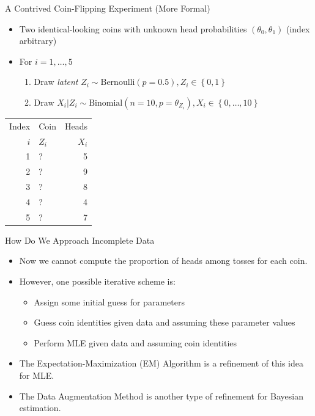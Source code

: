 \documentclass[dvipdfmx,bigger,aspectratio=169]{beamer}
\begin{document}
\begin{frame}[label={sec:orgcd74999}]{A Contrived Coin-Flipping Experiment (More Formal)}
\begin{itemize}
\item Two identical-looking coins with unknown head probabilities \((\theta_{0},\theta_{1})\) (index arbitrary)
\item For \(i = 1, \dots, 5\)
\begin{enumerate}
\item Draw \emph{latent} \(Z_{i} \sim \text{Bernoulli}(p = 0.5), Z_{i} \in \left\{ 0,1 \right\}\)
\item Draw \(X_{i} | Z_{i} \sim \text{Binomial}(n = 10, p = \theta_{Z_{i}}), X_{i} \in \left\{ 0, \dots, 10 \right\}\)
\end{enumerate}
\end{itemize}
\begin{center}
\begin{tabular}{rlr}
Index & Coin & Heads\\
\(i\) & \(Z_{i}\) & \(X_{i}\)\\
\hline
1 & ? & 5\\
2 & ? & 9\\
3 & ? & 8\\
4 & ? & 4\\
5 & ? & 7\\
\end{tabular}
\end{center}
\end{frame}

\begin{frame}[label={sec:org0a7bc05}]{How Do We Approach Incomplete Data}
\begin{itemize}
\item Now we cannot compute the proportion of heads among tosses for each coin.
\item However, one possible iterative scheme is:
\begin{itemize}
\item Assign some initial guess for parameters
\item Guess coin identities given data and assuming these parameter values
\item Perform MLE given data and assuming coin identities
\end{itemize}
\item The Expectation-Maximization (EM) Algorithm \cite{dempsterMaximumLikelihoodIncomplete1977} is a refinement of this idea for MLE.
\item The Data Augmentation Method \cite{tannerCalculationPosteriorDistributions1987} is another type of refinement for Bayesian estimation.
\end{itemize}
\end{frame}
\end{document}
